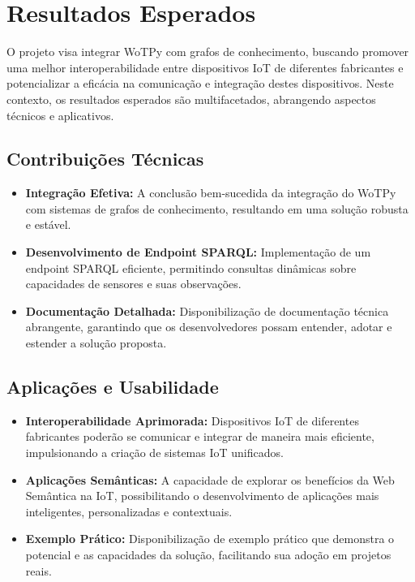 \chapter{Resultados Esperados}

O projeto visa integrar WoTPy com grafos de conhecimento, buscando promover uma melhor interoperabilidade entre dispositivos IoT de diferentes fabricantes e potencializar a eficácia na comunicação e integração destes dispositivos. Neste contexto, os resultados esperados são multifacetados, abrangendo aspectos técnicos e aplicativos.

\section{Contribuições Técnicas}

\begin{itemize}
    \item \textbf{Integração Efetiva:} A conclusão bem-sucedida da integração do WoTPy com sistemas de grafos de conhecimento, resultando em uma solução robusta e estável.
    \item \textbf{Desenvolvimento de Endpoint SPARQL:} Implementação de um endpoint SPARQL eficiente, permitindo consultas dinâmicas sobre capacidades de sensores e suas observações.
    \item \textbf{Documentação Detalhada:} Disponibilização de documentação técnica abrangente, garantindo que os desenvolvedores possam entender, adotar e estender a solução proposta.
\end{itemize}

\section{Aplicações e Usabilidade}

\begin{itemize}
    \item \textbf{Interoperabilidade Aprimorada:} Dispositivos IoT de diferentes fabricantes poderão se comunicar e integrar de maneira mais eficiente, impulsionando a criação de sistemas IoT unificados.
    \item \textbf{Aplicações Semânticas:} A capacidade de explorar os benefícios da Web Semântica na IoT, possibilitando o desenvolvimento de aplicações mais inteligentes, personalizadas e contextuais.
    \item \textbf{Exemplo Prático:} Disponibilização de exemplo prático que demonstra o potencial e as capacidades da solução, facilitando sua adoção em projetos reais.
\end{itemize}

